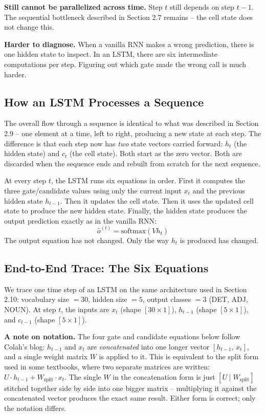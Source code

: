 \documentclass[12pt,a4paper]{article}
\begin{document}
\textbf{Still cannot be parallelized across time.} Step $t$ still depends on step
$t-1$. The sequential bottleneck described in Section 2.7 remains -- the cell state
does not change this.

\textbf{Harder to diagnose.} When a vanilla RNN makes a wrong prediction, there is
one hidden state to inspect. In an LSTM, there are six intermediate computations per
step. Figuring out which gate made the wrong call is much harder.

\subsection{How an LSTM Processes a Sequence}

The overall flow through a sequence is identical to what was described in Section 2.9 --
one element at a time, left to right, producing a new state at each step. The difference
is that each step now has \textit{two} state vectors carried forward: $h_t$ (the
hidden state) and $c_t$ (the cell state). Both start as the zero vector. Both are
discarded when the sequence ends and rebuilt from scratch for the next sequence.

At every step $t$, the LSTM runs six equations in order. First it computes the three
gate/candidate values using only the current input $x_t$ and the previous hidden state
$h_{t-1}$. Then it updates the cell state. Then it uses the updated cell state to
produce the new hidden state. Finally, the hidden state produces the output prediction
exactly as in the vanilla RNN:
\[
\hat{o}^{(t)} = \text{softmax}(V h_t)
\]
The output equation has not changed. Only the way $h_t$ is produced has changed.

\subsection{End-to-End Trace: The Six Equations}

We trace one time step of an LSTM on the same architecture used in Section 2.10:
vocabulary size $= 30$, hidden size $= 5$, output classes $= 3$ (DET, ADJ, NOUN).
At step $t$, the inputs are $x_t$ (shape $[30 \times 1]$), $h_{t-1}$ (shape
$[5 \times 1]$), and $c_{t-1}$ (shape $[5 \times 1]$).

\textbf{A note on notation.} The four gate and candidate equations below follow Colah's blog: $h_{t-1}$ and $x_t$ are \textit{concatenated} into one longer vector $[h_{t-1},\, x_t]$, and a single weight matrix $W$ is applied to it. This is equivalent to the split form used in some textbooks, where two separate matrices are written: $U \cdot h_{t-1} + W_{\text{split}} \cdot x_t$. The single $W$ in the concatenation form is just $[U \mid W_{\text{split}}]$ stitched together side by side into one bigger matrix -- multiplying it against the concatenated vector produces the exact same result. Either form is correct; only the notation differs.
\end{document}
